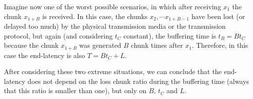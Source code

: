 Imagine now one of the worst possible scenarios, in which after
receiving $x_1$ the chunk $x_{1+B}$ is received. In this case, the
chunks $x_2, \cdots x_{1+B-1}$ have been lost (or delayed too much) by
the physical transmission media or the transmission protocol, but
again (and considering $t_C$ constant), the buffering time is
$t_B=Bt_C$ because the chunk $x_{1+B}$ was generated $B$ chunk times
after $x_1$. Therefore, in this case the end-latency is also
$T=Bt_C+L$.

After considering these two extreme situations, we can conclude that
the end-latency does not depend on the loss chunk ratio during the
buffering time (always that this ratio is smaller than one), but only
on $B$, $t_C$ and $L$.
